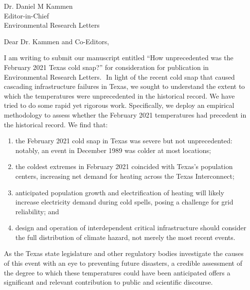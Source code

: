 \documentclass{scrartcl}
\date{\today} %
\begin{document}

\begin{letter}{Dr. Daniel M Kammen\\Editor-in-Chief\\Environmental Research Letters} %


	\opening{Dear Dr. Kammen and Co-Editors,}


	I am writing to submit our manuscript entitled ``How unprecedented was the February 2021 Texas cold snap?'' for consideration for publication in Environmental Research Letters.
	​
	In light of the recent cold snap that caused cascading infrastructure failures in Texas, we sought to understand the extent to which the temperatures were unprecedented in the historical record.
	We have tried to do some rapid yet rigorous work.
	Specifically, we deploy an empirical methodology to assess whether the February 2021 temperatures had precedent in the historical record.
	We find that:
	\begin{enumerate}
		\item the February 2021 cold snap in Texas was severe but not unprecedented: notably, an event in December 1989 was colder at most locations;
		\item the coldest extremes in February 2021 coincided with Texas's population centers, increasing net demand for heating across the Texas Interconnect;
		\item anticipated population growth and electrification of heating will likely increase electricity demand during cold spells, posing a challenge for grid reliability; and
		\item design and operation of interdependent critical infrastructure should consider the full distribution of climate hazard, not merely the most recent events.
	\end{enumerate}
	As the Texas state legislature and other regulatory bodies investigate the causes of this event with an eye to preventing future disasters, a credible assessment of the degree to which these temperatures could have been anticipated offers a significant and relevant contribution to public and scientific discourse.

\end{letter}
\end{document}
